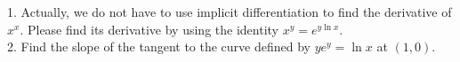 1. Actually, we do not have to use implicit differentiation to find the derivative of $x^x$. Please find its derivative by using the identity $x^y=e^{y\ln x}$.\\
2. Find the slope of the tangent to the curve defined by $ye^y=\ln x$ at $(1,0)$.